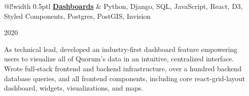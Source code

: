 \documentclass[]{article}
\newcommand\VRule{\color{lightgray}\vrule width 0.5pt}
\begin{document}

\begin{tabular}{@{}l!{\VRule}l}
	{\bf \href{https://www.quorum.us/solutions/reporting/}{Dashboards}} & Python, Django, SQL, JavaScript, React, D3, Styled Components, Postgres, PostGIS, Invision\\
\end{tabular}\hfill{\footnotesize 2020}

As technical lead, developed an industry-first dashboard feature empowering users to visualize all of Quorum's data in an intuitive, centralized interface. Wrote full-stack frontend and backend infrastructure, over a hundred backend database queries, and all frontend components, including core react-grid-layout dashboard, widgets, visualizations, and maps.\\
\end{document}
